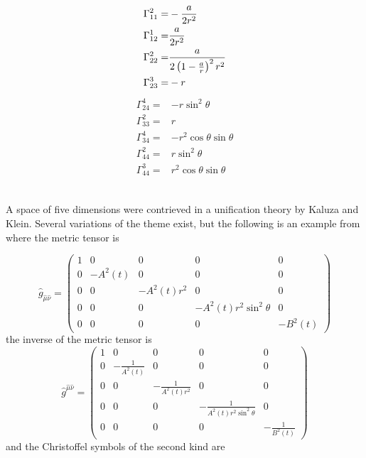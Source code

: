 {\begin{twocol}{
\begin{eqnarray*}
\Gamma_{11}^{2}=&-{{a}\over{2r^2}}\\
\Gamma_{12}^{1}=&{{a}\over{2r^2}}\\
\Gamma_{22}^{2}=&{{a}\over{2\left(1-{{a}\over{r}}\right)^2r^2 }}\\
\Gamma_{23}^{3}=&-r\\
\end{eqnarray*}}
{
\begin{eqnarray*}
\Gamma_{24}^{4}=&-r\sin ^2\theta\\
\Gamma_{33}^{2}=&r\\
\Gamma_{34}^{4}=&-r^2\cos \theta\sin \theta\\
\Gamma_{44}^{2}=&r\sin ^2\theta\\
\Gamma_{44}^{3}=&r^2\cos \theta\sin \theta\\
\end{eqnarray*}}
\end{twocol}

\subsection{}
A space of five dimensions were contrieved in a unification theory by Kaluza and Klein.
Several variations of the theme exist, but the following is an example from \cite{art:tiwari} where
the  metric tensor is


$$
 \hat{g}_{\hat{\mu}\hat{\nu}} = 
     \begin{pmatrix}
         1  &  0  &  0   &  0                 & 0 \\
         0  & -A^2(t)  &  0   &  0                 & 0 \\
         0  &  0  & -A^2(t)r^2 &  0                 & 0 \\
         0  &  0  &  0   & -A^2(t)r^2\sin^2\theta & 0 \\
         0  &  0  &  0   &  0                 & -B^2(t) 
    \end{pmatrix} 
$$
the inverse of the metric tensor is 
$$
 \hat{g}^{\hat{\mu}\hat{\nu}} = 
     \begin{pmatrix}
         1  &  0  &  0   &  0                 & 0 \\
         0  & -\frac{1}{A^2(t)}  &  0   &  0                 & 0 \\
         0  &  0  & -\frac{1}{A^2(t)r^2} &  0                 & 0 \\
         0  &  0  &  0   & -\frac{1}{A^2(t)r^2\sin^2\theta} & 0 \\
         0  &  0  &  0   &  0                 & -\frac{1}{B^2(t)} 
    \end{pmatrix} 
$$
and the Christoffel symbols of the second kind are



}
